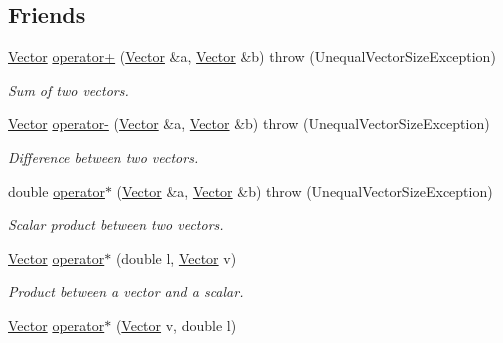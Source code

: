 \subsection*{Friends}
\begin{CompactItemize}
\item 
\hyperlink{classgrassmann_1_1Vector}{Vector} \hyperlink{classgrassmann_1_1Vector_802964ed6ee76e3b82662c7b0bfa251a}{operator+} (\hyperlink{classgrassmann_1_1Vector}{Vector} \&a, \hyperlink{classgrassmann_1_1Vector}{Vector} \&b)  throw (UnequalVectorSizeException)
\begin{CompactList}\small\item\em Sum of two vectors. \item\end{CompactList}\item 
\hyperlink{classgrassmann_1_1Vector}{Vector} \hyperlink{classgrassmann_1_1Vector_ac3997b0f5002019c4373e8f9005f85b}{operator-} (\hyperlink{classgrassmann_1_1Vector}{Vector} \&a, \hyperlink{classgrassmann_1_1Vector}{Vector} \&b)  throw (UnequalVectorSizeException)
\begin{CompactList}\small\item\em Difference between two vectors. \item\end{CompactList}\item 
double \hyperlink{classgrassmann_1_1Vector_cd40ad4e72bc86ac3fbf725cf8184d2d}{operator$\ast$} (\hyperlink{classgrassmann_1_1Vector}{Vector} \&a, \hyperlink{classgrassmann_1_1Vector}{Vector} \&b)  throw (UnequalVectorSizeException)
\begin{CompactList}\small\item\em Scalar product between two vectors. \item\end{CompactList}\item 
\hyperlink{classgrassmann_1_1Vector}{Vector} \hyperlink{classgrassmann_1_1Vector_e5f388dfbc55ca5afce80591fbfdcd67}{operator$\ast$} (double l, \hyperlink{classgrassmann_1_1Vector}{Vector} v)
\begin{CompactList}\small\item\em Product between a vector and a scalar. \item\end{CompactList}\item 
\hyperlink{classgrassmann_1_1Vector}{Vector} \hyperlink{classgrassmann_1_1Vector_0b7d545365b106c4a84d6970964ab56c}{operator$\ast$} (\hyperlink{classgrassmann_1_1Vector}{Vector} v, double l)

\end{CompactItemize}
